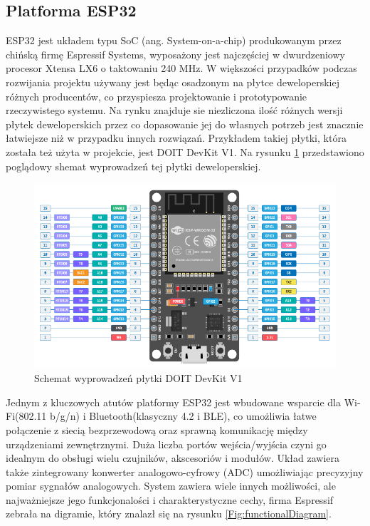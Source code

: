 \documentclass[12pt,twoside]{article}
\begin{document}
\subsection{Platforma ESP32}
ESP32 jest układem typu SoC (ang. System-on-a-chip) produkowanym przez chińską firmę Espressif Systems,
wyposażony jest najczęściej w dwurdzeniowy procesor Xtensa LX6 o taktowaniu 240 MHz\cite{esp32Datasheet}. W większości przypadków podczas rozwijania projektu używany jest będąc osadzonym na płytce deweloperskiej różnych producentów, co przyspiesza projektowanie i prototypowanie rzeczywistego systemu. Na rynku znajduje sie niezliczona ilość różnych wersji płytek deweloperskich przez co dopasowanie
jej do własnych potrzeb jest znacznie łatwiejsze niż w przypadku innych rozwiązań. Przykładem takiej płytki, która została też użyta w projekcie, jest DOIT DevKit V1\cite{doitDevKitV1}. Na rysunku \ref*{Fig:devkitScheme} przedstawiono poglądowy shemat wyprowadzeń tej płytki deweloperskiej.

\begin{figure}[ht]
   \centering
   \includegraphics[width=13cm]{images/doit_devkit_v1.png}
   \caption{Schemat wyprowadzeń płytki DOIT DevKit V1 \cite{doitDevKitV1}}
   \label{Fig:devkitScheme}
\end{figure}

Jednym z kluczowych atutów platformy ESP32 jest wbudowane wsparcie dla Wi-Fi(802.11 b/g/n) i Bluetooth(klasyczny 4.2 i BLE), co umożliwia łatwe połączenie z siecią bezprzewodową oraz sprawną komunikację między urządzeniami zewnętrznymi.
Duża licz\-ba portów wejścia/wyjścia czyni go idealnym do obsługi wielu czujników, akscesoriów i modułów. Układ zawiera także zintegrowany konwerter analogowo-cyfrowy (ADC) umożliwiając precyzyjny pomiar sygnałów analogowych. System zawiera wiele innych możliwości, ale najważniejsze jego funkcjonalości i charakterystyczne cechy, firma Espressif zebrała na digramie,  który znalazł się na rysunku \ref*{Fig:functionalDiagram}.
\end{document}
